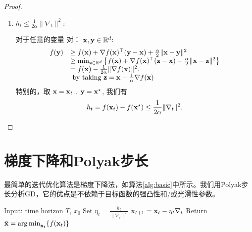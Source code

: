 \begin{proof}
\begin{enumerate}
\item   $h_t \leq \frac{1}{2\alpha} \|\nabla_t\|^2 $:  %
    
对于任意的变量 对：
$\mathbf x,\mathbf y \in {\mathbb R}^d$:
\begin{equation*}
\begin{array}{cl}
f(\mathbf y)  & \ge  f(\mathbf x) +   \nabla f(\mathbf x)^\top  (\mathbf y - \mathbf x ) + \frac{\alpha}{2}  \|\mathbf x - \mathbf y\|^2  \\
&\ge  \min_{\mathbf z \in {\mathbb R}^d } \left\{ f(\mathbf x) +   \nabla f(\mathbf x)^\top  (\mathbf z - \mathbf x ) + \frac{\alpha}{2}  \|\mathbf x - \mathbf z\|^2 \right\} \\
& =  f(\mathbf x) - \frac{1}{2  \alpha} \| \nabla f(\mathbf x)\|^2. \\
& \text{ by taking $\mathbf z = \mathbf x - \frac{1}{ \alpha} \nabla f(\mathbf x) $ }
\end{array}
\end{equation*}
特别的，取
$\mathbf x = \mathbf x_t \ , \ \mathbf y = \mathbf x^\star$, 
我们有
\begin{equation} \label{eqn:gradlowerbound}
 h_t =  f(\mathbf x_t) - f(\mathbf x^\star)  \leq \frac{1}{2 \alpha} \|\nabla_t\|^2  .
\end{equation}

\end{enumerate}
\end{proof}





\section{
    梯度下降和Polyak步长
    } 

最简单的迭代优化算法是梯度下降法，如算法\ref{alg:basic}中所示。我们用Polyak步长分析GD，它的优点是不依赖于目标函数的强凸性和/或光滑性参数。
\begin{algorithm}[h!]
\caption{
    使用Polyak步长的GD
    }
\label{alg:basic}
\begin{algorithmic}[1]
\STATE Input: time horizon $T$, $x_0$
\STATE Set $\eta_t =  \frac{h_t}{\|\nabla_t\|^2} $
\STATE  $ \mathbf x_{t+1}  =   \mathbf x_t - \eta_t \nabla_t $
\ENDFOR
\STATE Return $\bar{\mathbf{x}} = \operatorname*{\arg\min}_{\mathbf x_t} \{ f(\mathbf x_t) \}$
\end{algorithmic}
\end{algorithm}


